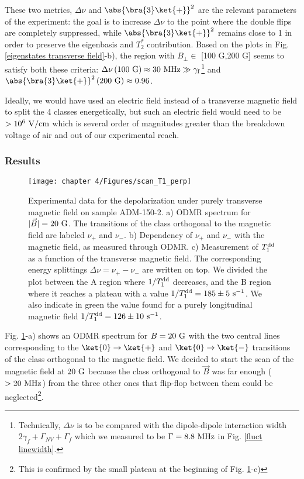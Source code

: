 \documentclass[a4paper, 11pt]{report}
\begin{document}
These two metrics, $\Delta \nu$ and $\abs{\bra{3}\ket{+}}^2$ are the relevant parameters of the experiment: the goal is to increase $\Delta \nu$ to the point where the double flips are completely suppressed, while $\abs{\bra{3}\ket{+}}^2$ remains close to 1 in order to preserve the eigenbasis and $T_2^*$ contribution. Based on the plots in Fig.\ref{eigenstates transverse field}-b), the region with $B_\perp \in$ [100 G,200 G] seems to satisfy both these criteria: $\Delta \nu\,(100\ \rm G) \approx 30\ \rm MHz \gg \gamma_f$\footnote{Technically, $\Delta \nu$ is to be compared with the dipole-dipole interaction width $2\gamma_f+\Gamma_{NV}+\Gamma_f$ which we measured to be $\Gamma=8.8\ \rm MHz$ in Fig. \ref{fluct linewidth}.} and $\abs{\bra{3}\ket{+}}^2\, (200\ \rm G) \approx 0.96$.

Ideally, we would have used an electric field instead of a transverse magnetic field to split the 4 classes energetically, but such an electric field would need to be $> 10^6\ \rm{V/cm}$ which is several order of magnitudes greater than the breakdown voltage of air and out of our experimental reach.

\subsubsection{Results}

\begin{figure}[h!]
\centering
\texttt{[image: chapter 4/Figures/scan\_T1\_perp]}
\caption{Experimental data for the depolarization under purely transverse magnetic field on sample ADM-150-2. a) ODMR spectrum for $|\vec{B}|=20\ \rm G$. The transitions of the class orthogonal to the magnetic field are labeled $\nu_+$ and $\nu_-$. b) Dependency of $\nu_+$ and $\nu_-$ with the magnetic field, as measured through ODMR. c) Measurement of $T_1^{\rm dd}$ as a function of the transverse magnetic field. The corresponding energy splittings $\Delta \nu=\nu_+-\nu_-$ are written on top. We divided the plot between the A region where $1/T_1^{\rm dd}$ decreases, and the B region where it reaches a plateau with a value $1/T_1^{\rm dd}=185 \pm 5\ \rm s^{-1}$. We also indicate in green the value found for a purely longitudinal magnetic field $1/T_1^{\rm dd}=126 \pm 10\ \rm s^{-1}$.}
\label{champ tranverse exp}
\end{figure}

Fig. \ref{champ tranverse exp}-a) shows an ODMR spectrum for $B=20\ \rm G$ with the two central lines corresponding to the $\ket{0} \to \ket{+}$ and $\ket{0} \to \ket{-}$ transitions of the class orthogonal to the magnetic field. We decided to start the scan of the magnetic field at $20\ \rm G$ because the class orthogonal to $\vec{B}$ was far enough ($> 20 \ \rm MHz$) from the three other ones that flip-flop between them could be neglected\footnote{This is confirmed by the small plateau at the beginning of Fig. \ref{champ tranverse exp}-c)}.
\end{document}
